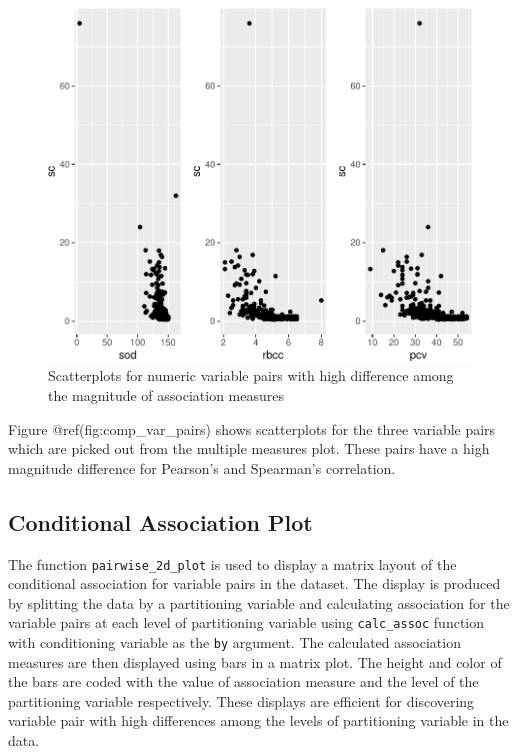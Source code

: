 \begin{Schunk}
\begin{figure}

{\centering \includegraphics{rj_paper_files/figure-latex/comp_var_pairs-1} 

}

\caption[Scatterplots for numeric variable pairs with high difference among the magnitude of association measures]{Scatterplots for numeric variable pairs with high difference among the magnitude of association measures}\label{fig:comp_var_pairs}
\end{figure}
\end{Schunk}

Figure @ref(fig:comp\_var\_pairs) shows scatterplots for the three
variable pairs which are picked out from the multiple measures plot.
These pairs have a high magnitude difference for Pearson's and
Spearman's correlation.

\hypertarget{conditional-association-plot}{%
\subsection{Conditional Association
Plot}\label{conditional-association-plot}}

The function \texttt{pairwise\_2d\_plot} is used to display a matrix
layout of the conditional association for variable pairs in the dataset.
The display is produced by splitting the data by a partitioning variable
and calculating association for the variable pairs at each level of
partitioning variable using \texttt{calc\_assoc} function with
conditioning variable as the \texttt{by} argument. The calculated
association measures are then displayed using bars in a matrix plot. The
height and color of the bars are coded with the value of association
measure and the level of the partitioning variable respectively. These
displays are efficient for discovering variable pair with high
differences among the levels of partitioning variable in the data.

